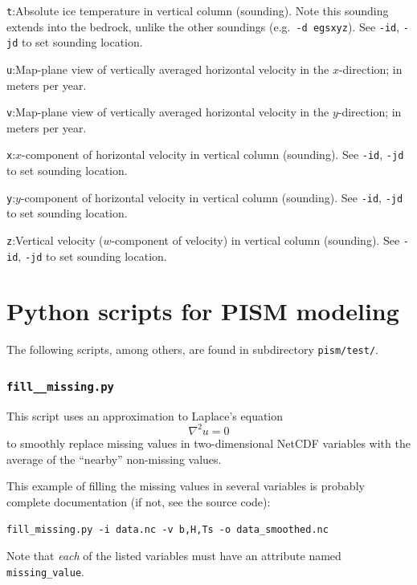 \documentclass[11pt,final]{amsart}
\newcommand{\grad}{\nabla}
\newcommand{\und}{\_\!\_}
\begin{document}
\verb|t|:\quad Absolute ice temperature in vertical column (sounding).  Note this sounding extends into the bedrock, unlike the other soundings (e.g.~\verb|-d egsxyz|).  See \verb|-id|, \verb|-jd| to set sounding location.

\verb|u|:\quad Map-plane view of vertically averaged horizontal velocity in the $x$-direction;  in meters per year.

\verb|v|:\quad Map-plane view of vertically averaged horizontal velocity in the $y$-direction;  in meters per year.

\verb|x|:\quad $x$-component of horizontal velocity in vertical column (sounding).  See \verb|-id|, \verb|-jd| to set sounding location.

\verb|y|:\quad $y$-component of horizontal velocity in vertical column (sounding).  See \verb|-id|, \verb|-jd| to set sounding location.

\verb|z|:\quad Vertical velocity ($w$-component of velocity) in vertical column (sounding).  See \verb|-id|, \verb|-jd| to set sounding location.



\clearpage \newpage
\section{Python scripts for PISM modeling}\label{sect:scripts}

\newcommand{\scriptoptdef}[3]{\vspace{1mm}\noindent \large\texttt{-#1},\,\,\texttt{--#2=}\normalsize\,\,[\textsl{#3}]:\quad}

The following scripts, among others, are found in subdirectory \verb|pism/test/|.

\subsubsection*{\Large{\texttt{fill\und missing.py}}}  This script uses an approximation to Laplace's equation
	$$\grad^2 u = 0$$
to smoothly replace missing values in two-dimensional NetCDF variables with the average of the ``nearby'' non-missing values.

This example of filling the missing values in several variables is probably complete documentation (if not, see the source code):

\verb|fill_missing.py -i data.nc -v b,H,Ts -o data_smoothed.nc|

\noindent Note that \emph{each} of the listed variables must have an attribute named \verb|missing_value|.
\end{document}
